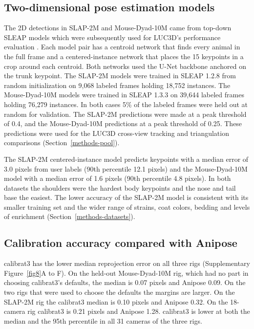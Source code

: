 \documentclass[pdflatex, sn-nature]{sn-jnl}
\theoremstyle{thmstyleone}%
\theoremstyle{thmstyletwo}%
\theoremstyle{thmstylethree}%
\begin{document}
\subsection{Two-dimensional pose estimation models}\label{methods-models}

The 2D detections in SLAP-2M and Mouse-Dyad-10M came from top-down SLEAP models which were subsequently used for LUC3D's performance evaluation \citep{Pereira2022}. Each model pair has a centroid network that finds every animal in the full frame and a centered-instance network that places the 15 keypoints in a crop around each centroid. Both networks used the U-Net backbone anchored on the trunk keypoint. The SLAP-2M models were trained in SLEAP 1.2.8 from random initialization on 9,068 labeled frames holding 18,752 instances. The Mouse-Dyad-10M models were trained in SLEAP 1.3.3 on 39,644 labeled frames holding 76,279 instances. In both cases 5\% of the labeled frames were held out at random for validation. The SLAP-2M predictions were made at a peak threshold of 0.4, and the Mouse-Dyad-10M predictions at a peak threshold of 0.25. These predictions were used for the LUC3D cross-view tracking and triangulation comparisons (Section~\ref{methods-pool}).

The SLAP-2M centered-instance model predicts keypoints with a median error of 3.0 pixels from user labels (90th percentile 12.1 pixels) and the Mouse-Dyad-10M model with a median error of 1.6 pixels (90th percentile 4.8 pixels). In both datasets the shoulders were the hardest body keypoints and the nose and tail base the easiest. The lower accuracy of the SLAP-2M model is consistent with its smaller training set and the wider range of strains, coat colors, bedding and levels of enrichment (Section~\ref{methods-datasets}).

\subsection{Calibration accuracy compared with Anipose}\label{subsec-calib}

calibrat3 has the lower median reprojection error on all three rigs (Supplementary Figure~\ref{fig8}A to F). On the held-out Mouse-Dyad-10M rig, which had no part in choosing calibrat3's defaults, the median is 0.07 pixels and Anipose 0.09. On the two rigs that were used to choose the defaults the margins are larger. On the SLAP-2M rig the calibrat3 median is 0.10 pixels and Anipose 0.32. On the 18-camera rig calibrat3 is 0.21 pixels and Anipose 1.28. calibrat3 is lower at both the median and the 95th percentile in all 31 cameras of the three rigs.
\end{document}
